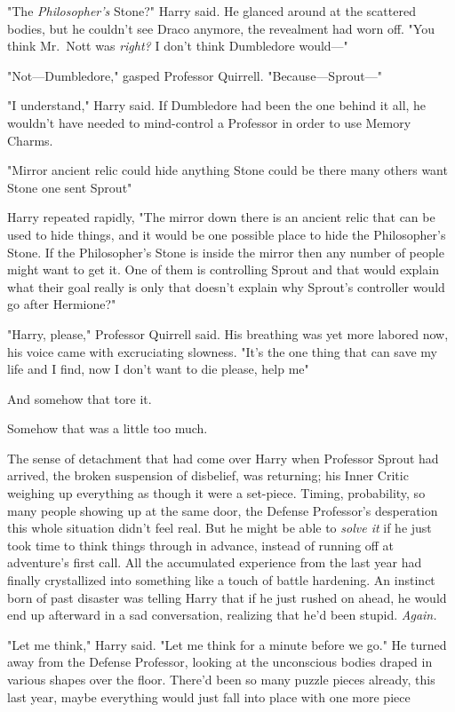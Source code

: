 "The \emph{Philosopher's} Stone?" Harry said. He glanced around at the
scattered bodies, but he couldn't see Draco anymore, the revealment had worn
off. "You think Mr.~Nott was \emph{right?} I don't think Dumbledore would—"

"Not—Dumbledore," gasped Professor Quirrell. "Because—Sprout—"

"I understand," Harry said. If Dumbledore had been the one behind it all, he
wouldn't have needed to mind-control a Professor in order to use Memory Charms.

"Mirror{\el} ancient relic{\el} could hide anything{\el} Stone could
be there{\el} many others want Stone{\el} one sent Sprout{\el}"

Harry repeated rapidly, "The mirror down there is an ancient relic that can be
used to hide things, and it would be one possible place to hide the
Philosopher's Stone. If the Philosopher's Stone is inside the mirror then any
number of people might want to get it. One of them is controlling Sprout and
that would explain what their goal really is{\el} only{\el} that doesn't
explain why Sprout's controller would go after Hermione?"

"Harry, please," Professor Quirrell said. His breathing was yet more labored
now, his voice came with excruciating slowness. "It's the one thing{\el}
that can save my life{\el} and I find, now{\el} I don't want to
die{\el} please, help me{\el}"

And somehow that tore it.

Somehow that was a little too much.

The sense of detachment that had come over Harry when Professor Sprout had
arrived, the broken suspension of disbelief, was returning; his Inner Critic
weighing up everything as though it were a set-piece. Timing, probability, so
many people showing up at the same door, the Defense Professor's
desperation{\el} this whole situation didn't feel real. But he might be able
to \emph{solve it} if he just took time to think things through in advance,
instead of running off at adventure's first call. All the accumulated
experience from the last year had finally crystallized into something like a
touch of battle hardening. An instinct born of past disaster was telling Harry
that if he just rushed on ahead, he would end up afterward in a sad
conversation, realizing that he'd been stupid. \emph{Again.}

"Let me think," Harry said. "Let me think for a minute before we go." He turned
away from the Defense Professor, looking at the unconscious bodies draped in
various shapes over the floor. There'd been so many puzzle pieces already, this
last year, maybe everything would just fall into place with one more
piece{\el}

